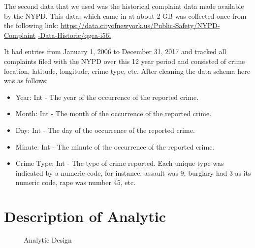 \documentclass[conference]{IEEEtran}
\begin{document}
The second data that we used was the historical complaint data made available by the NYPD.
This data, which came in at about 2 GB was collected once from the following link:
\underline{https://data.cityofnewyork.us/Public-Safety/NYPD- Complaint}
\underline{-Data-Historic/qgea-i56i}

It had entries from January 1, 2006 to December 31, 2017 and tracked all complaints filed with the NYPD over this 12 year period and consisted of crime location, latitude, longitude, crime type, etc.
After cleaning the data schema here was as follows:
\begin{itemize}
    \item Year: Int - The year of the occurrence of the reported crime.
    \item Month: Int - The month of the occurrence of the reported crime.
    \item Day: Int - The day of the occurrence of the reported crime.
    \item Minute: Int - The minute of the occurrence of the reported crime.
    \item Crime Type: Int - The type of crime reported. Each unique type was indicated by a numeric code, for instance, assault was 9, burglary had 3 as its numeric code, rape was number 45, etc.
\end{itemize}

\section{Description of Analytic}
\begin{figure}[htbp]
\centerline{}
\caption{Analytic Design}
\label{design}
\end{figure}
\end{document}
